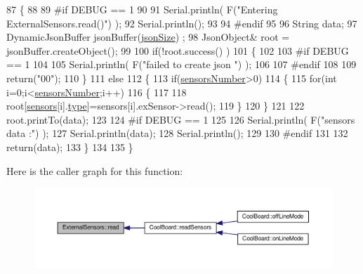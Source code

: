 \begin{DoxyCode}
87 \{
88 
89 \textcolor{preprocessor}{#if DEBUG == 1}
90 
91     Serial.println( F(\textcolor{stringliteral}{"Entering ExternalSensors.read()"}) );
92     Serial.println();
93 
94 \textcolor{preprocessor}{#endif }
95 
96     String data;
97     DynamicJsonBuffer  jsonBuffer(\hyperlink{classExternalSensors_acacea86d74d967b57fcff282d26cff57}{jsonSize}) ;
98     JsonObject& root = jsonBuffer.createObject();
99 
100     \textcolor{keywordflow}{if}(!root.success() )
101     \{
102  
103 \textcolor{preprocessor}{    #if DEBUG == 1}
104 
105         Serial.println( F(\textcolor{stringliteral}{"failed to create json "}) );
106     
107 \textcolor{preprocessor}{    #endif }
108 
109         \textcolor{keywordflow}{return}(\textcolor{stringliteral}{"00"});
110     \}
111     \textcolor{keywordflow}{else}
112     \{
113         \textcolor{keywordflow}{if}(\hyperlink{classExternalSensors_a58e4fbf9adeae787d92be5fa33043b5d}{sensorsNumber}>0)
114         \{
115             \textcolor{keywordflow}{for}(\textcolor{keywordtype}{int} i=0;i<\hyperlink{classExternalSensors_a58e4fbf9adeae787d92be5fa33043b5d}{sensorsNumber};i++)
116             \{
117             
118                 root[\hyperlink{classExternalSensors_a284233f884fcf00154a44740cf1d9e1e}{sensors}[i].\hyperlink{structExternalSensors_1_1sensor_a6acfdb02c742c2110d7bd2b5d9fce9e7}{type}]=sensors[i].exSensor->read();       
119             \}
120         \}   
121         
122         root.printTo(data);
123     
124 \textcolor{preprocessor}{    #if DEBUG == 1}
125 
126         Serial.println( F(\textcolor{stringliteral}{"sensors data :"}) );
127         Serial.println(data);
128         Serial.println();
129     
130 \textcolor{preprocessor}{    #endif}
131     
132         \textcolor{keywordflow}{return}(data);
133     \}
134 
135 \}
\end{DoxyCode}
Here is the caller graph for this function\+:
\nopagebreak
\begin{figure}[H]
\begin{center}
\leavevmode
\includegraphics[width=350pt]{classExternalSensors_a53177b81eca3be89508b5511ddcd00fc_icgraph}
\end{center}
\end{figure}


